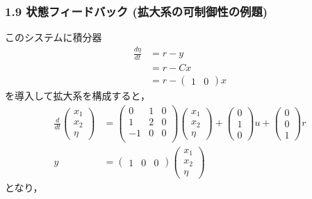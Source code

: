 \documentclass[10pt]{beamer}
\begin{document}
\begin{frame}[t]
\frametitle{1.9 状態フィードバック (拡大系の可制御性の例題)}
このシステムに積分器
\begin{align}
 \frac{d\eta}{dt} &= r - y \\
 &= r - Cx \\
 &= r - \left(\begin{array}{cc}1 & 0\end{array}\right)x
\end{align}
を導入して拡大系を構成すると，
\begin{align}
 \frac{d}{dt}
 \left(
 \begin{array}{c}
  x_1 \\
  x_2 \\
  \eta
 \end{array}
 \right) &=
 \left(
 \begin{array}{ccc}
  0 & 1 & 0 \\
  1 & 2 & 0 \\
  -1 & 0 & 0 \\
 \end{array}
 \right)
 \left(
 \begin{array}{c}
  x_1 \\
  x_2 \\
  \eta
 \end{array}
 \right) +
 \left(
 \begin{array}{c}
  0 \\
  1 \\
  0
 \end{array}
 \right) u +
 \left(
 \begin{array}{c}
  0 \\
  0 \\
  1
 \end{array}
 \right) r \\
 y &=
 \left(
 \begin{array}{ccc}
  1 & 0 & 0
 \end{array}
 \right)
 \left(
 \begin{array}{c}
  x_1 \\
  x_2 \\
  \eta
 \end{array}
 \right)
\end{align}
となり，
\end{frame}
\end{document}
